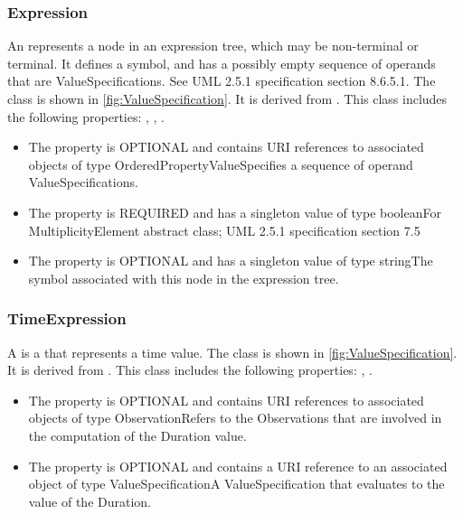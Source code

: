 \subsubsection{Expression}%
\label{sec:uml:Expression}%
An  represents a node in an expression tree, which may be non-terminal or terminal. It defines a symbol, and has a possibly empty sequence of operands that are ValueSpecifications. See UML 2.5.1 specification section 8.6.5.1.%
\newline%
\linebreak%
The  class is shown in \ref{fig:ValueSpecification}. It is derived from .%
This class includes the following properties: , , . %
\begin{itemize}%
\item%
The  property is OPTIONAL and contains URI references to associated objects of type OrderedPropertyValueSpecifies a sequence of operand ValueSpecifications.%
\item%
The  property is REQUIRED and has a singleton value of type booleanFor MultiplicityElement abstract class; UML 2.5.1 specification section 7.5%
\item%
The  property is OPTIONAL and has a singleton value of type stringThe symbol associated with this node in the expression tree.%
\end{itemize}%
\subsubsection{TimeExpression}%
\label{sec:uml:TimeExpression}%
A  is a  that represents a time value.%
\newline%
\linebreak%
The  class is shown in \ref{fig:ValueSpecification}. It is derived from .%
This class includes the following properties: , . %
\begin{itemize}%
\item%
The  property is OPTIONAL and contains URI references to associated objects of type ObservationRefers to the Observations that are involved in the computation of the Duration value.%
\item%
The  property is OPTIONAL and contains a URI reference to an associated object of type ValueSpecificationA ValueSpecification that evaluates to the value of the Duration.%
\end{itemize}%
